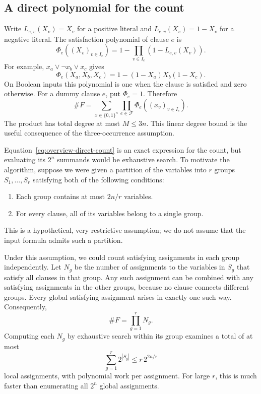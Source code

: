 \documentclass[11pt,reqno]{amsart}
\numberwithin{equation}{section}
\theoremstyle{definition}\newtheorem{definition}[theorem]{Definition}
\theoremstyle{remark}\newtheorem{remark}[theorem]{Remark}
\renewcommand{\le}{\leqslant}
\begin{document}
\subsection{A direct polynomial for the count}\label{subsec:preview-encoding}
Write $L_{e,v}(X_v)=X_v$ for a positive literal and
$L_{e,v}(X_v)=1-X_v$ for a negative literal. The satisfaction
polynomial of clause $e$ is
\[
 \Phi_e((X_v)_{v\in I_e})
 =1-\prod_{v\in I_e}(1-L_{e,v}(X_v)).
\]
For example, $x_a\vee\neg x_b\vee x_c$ gives
\[
 \Phi_e(X_a,X_b,X_c)=1-(1-X_a)X_b(1-X_c).
\]
On Boolean inputs this polynomial is one when the clause is
satisfied and zero otherwise. For a dummy clause $e$, put
$\Phi_e=1$. Therefore
\begin{equation}\label{eq:overview-direct-count}
 \#F=\sum_{x\in\{0,1\}^n}\prod_{e\in\mathcal F}
                   \Phi_e((x_v)_{v\in I_e}).
\end{equation}
The product has total degree at most $M\le3n$.
This linear degree bound is the useful consequence of the
three-occurrence assumption.

Equation~\eqref{eq:overview-direct-count} is an exact expression for
the count, but evaluating its $2^n$ summands would be exhaustive search.
To motivate the algorithm, suppose we were given a partition
of the variables into $r$ groups $S_1,\ldots,S_r$ satisfying
both of the following conditions:
\begin{enumerate}
\item Each group contains at most $2n/r$ variables.
\item For every clause, all of its variables belong to a single group.
\end{enumerate}
This is a hypothetical, very restrictive assumption; we do not
assume that the input formula admits such a partition.

Under this assumption, we could count satisfying assignments in
each group independently. Let $N_g$ be the number of assignments
to the variables in $S_g$ that satisfy all clauses in that group.
Any such assignment can be combined with any satisfying assignments
in the other groups, because no clause connects different groups.
Every global satisfying assignment arises in exactly one such way.
Consequently,
\[
 \#F=\prod_{g=1}^r N_g.
\]
Computing each $N_g$ by exhaustive search within its group examines
a total of at most
\[
 \sum_{g=1}^r 2^{|S_g|}\le r\,2^{2n/r}
\]
local assignments, with polynomial work per assignment. For large
$r$, this is much faster than enumerating all $2^n$ global assignments.
\end{document}
